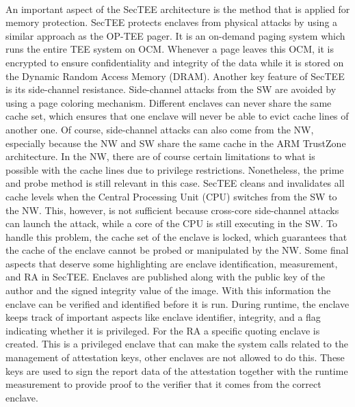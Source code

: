 \paragraph*{}
An important aspect of the SecTEE architecture is the method that is applied for memory protection. SecTEE protects enclaves from physical attacks by using a similar approach as the OP-TEE pager. It is an on-demand paging system which runs the entire TEE system on OCM. Whenever a page leaves this OCM, it is encrypted to ensure confidentiality and integrity of the data while it is stored on the Dynamic Random Access Memory (DRAM). Another key feature of SecTEE is its side-channel resistance. Side-channel attacks from the SW are avoided by using a page coloring mechanism. Different enclaves can never share the same cache set, which ensures that one enclave will never be able to evict cache lines of another one. Of course, side-channel attacks can also come from the NW, especially because the NW and SW share the same cache in the ARM TrustZone architecture. In the NW, there are of course certain limitations to what is possible with the cache lines due to privilege restrictions. Nonetheless, the prime and probe method is still relevant in this case. SecTEE cleans and invalidates all cache levels when the Central Processing Unit (CPU) switches from the SW to the NW. This, however, is not sufficient because cross-core side-channel attacks can launch the attack, while a core of the CPU is still executing in the SW. To handle this problem, the cache set of the enclave is locked, which guarantees that the cache of the enclave cannot be probed or manipulated by the NW. Some final aspects that deserve some highlighting are enclave identification, measurement, and RA in SecTEE. Enclaves are published along with the public key of the author and the signed integrity value of the image. With this information the enclave can be verified and identified before it is run. During runtime, the enclave keeps track of important aspects like enclave identifier, integrity, and a flag indicating whether it is privileged. For the RA a specific quoting enclave is created. This is a privileged enclave that can make the system calls related to the management of attestation keys, other enclaves are not allowed to do this. These keys are used to sign the report data of the attestation together with the runtime measurement to provide proof to the verifier that it comes from the correct enclave.

